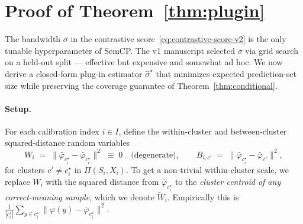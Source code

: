 
\section{Proof of Theorem~\ref{thm:plugin}}
\label{sec:theorem2}

The bandwidth $\sigma$ in the contrastive score~\eqref{eq:contrastive-score-v2}
is the only tunable hyperparameter of SemCP. The v1 manuscript selected
$\sigma$ via grid search on a held-out split — effective but expensive
and somewhat ad hoc. We now derive a closed-form plug-in estimator
$\hat\sigma^\star$ that minimizes expected prediction-set size while
preserving the coverage guarantee of Theorem~\ref{thm:conditional}.

\paragraph{Setup.}
For each calibration index $i \in I$, define the within-cluster and
between-cluster squared-distance random variables
\[
W_i \;=\; \bigl\|\bar\varphi_{c_i^\star} - \bar\varphi_{c_i^\star}\bigr\|^2 \;\equiv\; 0
\quad\text{(degenerate)}, \qquad
B_{i, c'} \;=\; \bigl\|\bar\varphi_{c_i^\star} - \bar\varphi_{c'}\bigr\|^2,
\]
for clusters $c' \neq c_i^\star$ in $\Pi(S_i, X_i)$. To get a non-trivial
within-cluster scale, we replace $W_i$ with the squared distance from
$\bar\varphi_{c_i^\star}$ to the \emph{cluster centroid of any
correct-meaning sample}, which we denote $\widetilde W_i$. Empirically
this is $\frac{1}{|c_i^\star|} \sum_{y \in c_i^\star} \|\varphi(y) - \bar\varphi_{c_i^\star}\|^2$.



